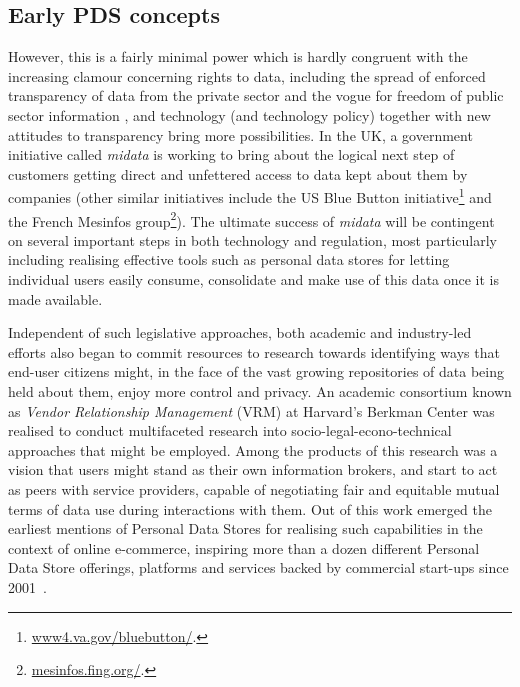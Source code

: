 \documentclass{acm_proc_article-sp}
\begin{document}
% 
\subsection{Early PDS concepts}

However, this is a fairly minimal power which is hardly congruent with the increasing clamour concerning rights to data, including the spread of enforced transparency of data from the private sector \cite{fung2007} and the vogue for freedom of public sector information \cite{ohara2014}, and technology (and technology policy) together with new attitudes to transparency bring more possibilities. In the UK, a government initiative called \emph{midata} \cite{midata} is working to bring about the logical next step of customers getting direct and unfettered access to data kept about them by companies (other similar initiatives include the US Blue Button initiative\footnote{\url{www4.va.gov/bluebutton/}.} and the French Mesinfos group\footnote{\url{mesinfos.fing.org/}.}).  The ultimate success of \emph{midata} will be contingent on several important steps in both technology and regulation, most particularly including realising effective tools such as personal data stores for letting individual users easily consume, consolidate and make use of this data once it is made available.

Independent of such legislative approaches, both academic and industry-led efforts also began to commit resources to research towards identifying ways that end-user citizens might, in the face of the vast growing repositories of data being held about them, enjoy more control and privacy. An academic consortium known as \emph{Vendor Relationship Management} (VRM) at Harvard's Berkman Center was realised to conduct multifaceted research into socio-legal-econo-technical approaches that might be employed.  Among the products of this research was a vision that users might stand as their own information brokers, and start to act as peers with service providers, capable of negotiating fair and equitable mutual terms of data use during interactions with them\cite{agustin2001vendor}.  Out of this work emerged the earliest mentions of Personal Data Stores for realising such capabilities in the context of online e-commerce, inspiring more than a dozen different Personal Data Store offerings, platforms and services backed by commercial start-ups since 2001~\cite{ctrlshift}. 
\end{document}
